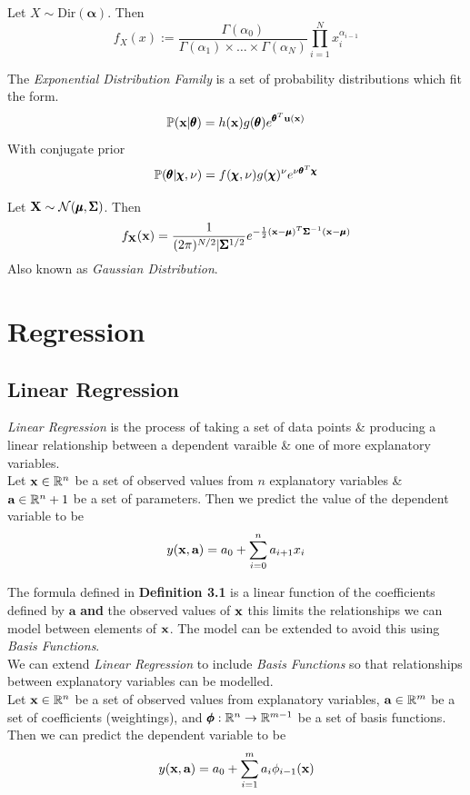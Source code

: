 \documentclass[11pt,a4paper]{article}
\begin{document}
Let $X\sim\text{Dir}(\pmb{\alpha})$. Then
$$f_X(x):=\dfrac{\Gamma(\alpha_0)}{\Gamma(\alpha_1)\times\dots\times\Gamma(\alpha_N)}\prod_{i=1}^Nx_i^{\alpha_{i-1}}$$

The \textit{Exponential Distribution Family} is a set of probability distributions which fit the form.
$$\mathbb{P}(\textbf{x}|\pmb{\theta})=h(\textbf{x})g(\pmb{\theta})e^{\pmb{\theta}^T\textbf{u}(\textbf{x})}$$
With conjugate prior
$$\mathbb{P}(\pmb{\theta}|\pmb{\chi},\nu)=f(\pmb{\chi},\nu)g(\pmb{\chi})^\nu e^{\nu\pmb{\theta}^T\pmb{\chi}}$$

Let $\textbf{X}\sim\mathcal{N}(\pmb{\mu},\pmb{\Sigma})$. Then
$$f_{\textbf{X}}(\textbf{x})=\dfrac{1}{(2\pi)^{N/2}|\pmb{\Sigma}^{1/2}}e^{-\frac{1}{2}(\textbf{x}-\pmb{\mu})^T\pmb{\Sigma}^{-1}(\textbf{x}-\pmb{\mu})}$$
\nb Also known as \textit{Gaussian Distribution}.\\

\section{Regression}

\subsection{Linear Regression}

\textit{Linear Regression} is the process of taking a set of data points \& producing a linear relationship between a dependent varaible \& one of more explanatory variables.\\
Let $\textbf{x}\in\mathbb{R}^n$ be a set of observed values from $n$ explanatory variables \& $\textbf{a}\in\mathbb{R}^n+1$ be a set of parameters. Then we predict the value of the dependent variable to be
$$y(\textbf{x},\textbf{a})=a_0+\sum\limits_{i=0}^na_{i+1}x_i$$

The formula defined in \textbf{Definition 3.1} is a linear function of the coefficients defined by $\textbf{a}$ \textbf{and} the observed values of $\textbf{x}$ this limits the relationships we can model between elements of $\textbf{x}$. The model can be extended to avoid this using \textit{Basis Functions}.\\

We can extend \textit{Linear Regression} to include \textit{Basis Functions} so that relationships between explanatory variables can be modelled.\\
Let $\textbf{x}\in\mathbb{R}^n$ be a set of observed values from explanatory variables, $\textbf{a}\in\mathbb{R}^{m}$ be a set of coefficients (weightings), and $\pmb{\phi}:\mathbb{R}^n\to\mathbb{R}^{m-1}$ be a set of basis functions. Then we can predict the dependent variable to be
$$y(\textbf{x},\textbf{a})=a_0+\sum_{i=1}^ma_i\phi_{i-1}(\textbf{x})$$
\end{document}
